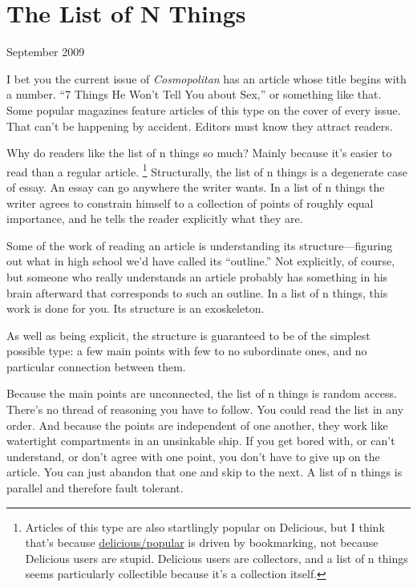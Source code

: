 \chapter{The List of N Things}

September 2009

I bet you the current issue of \emph{Cosmopolitan} has an article whose
title begins with a number. ``7 Things He Won't Tell You about Sex,'' or
something like that. Some popular magazines feature articles of this
type on the cover of every issue. That can't be happening by accident.
Editors must know they attract readers.

Why do readers like the list of n things so much? Mainly because it's
easier to read than a regular article. \footnote{Articles of this type are also startlingly popular on Delicious,
but I think that's because
\href{http://delicious.com/popular}{delicious/popular} is driven by
bookmarking, not because Delicious users are stupid. Delicious users are
collectors, and a list of n things seems particularly collectible
because it's a collection itself.}
Structurally, the list of n things is a degenerate case of essay. An
essay can go anywhere the writer wants. In a list of n things the writer
agrees to constrain himself to a collection of points of roughly equal
importance, and he tells the reader explicitly what they are.

Some of the work of reading an article is understanding its
structure---figuring out what in high school we'd have called its
``outline.'' Not explicitly, of course, but someone who really
understands an article probably has something in his brain afterward
that corresponds to such an outline. In a list of n things, this work is
done for you. Its structure is an exoskeleton.

As well as being explicit, the structure is guaranteed to be of the
simplest possible type: a few main points with few to no subordinate
ones, and no particular connection between them.

Because the main points are unconnected, the list of n things is random
access. There's no thread of reasoning you have to follow. You could
read the list in any order. And because the points are independent of
one another, they work like watertight compartments in an unsinkable
ship. If you get bored with, or can't understand, or don't agree with
one point, you don't have to give up on the article. You can just
abandon that one and skip to the next. A list of n things is parallel
and therefore fault tolerant.

